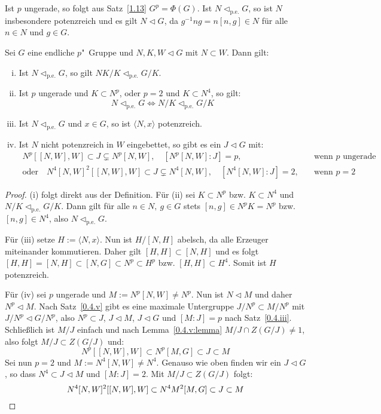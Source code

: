 \documentclass[11pt,a4paper,openany]{memoir}
\begin{document}
\begin{remark}
Ist $p$ ungerade, so folgt aus Satz~\ref{1.13} $G^p=\Phi(G)$. Ist $N\lhd_\text{p.e.}G$, so ist $N$ insbesondere potenzreich und es gilt $N\lhd G$, da $g^{-1}n g=n[n,g]\in N$ für alle $n\in N$ und $g\in G$.
\end{remark}

\begin{lemma}\label{2.2}
Sei $G$ eine endliche $p$"~Gruppe und $N,K,W\lhd G$ mit $N\subset W$. Dann gilt:
\begin{enumerate}[(i)]
\item Ist $N\lhd_\text{p.e.}G$, so gilt $NK/K\lhd_\text{p.e.}G/K$.
\item Ist $p$ ungerade und $K\subset N^p$, oder $p=2$ und $K\subset N^4$, so gilt: \[N\lhd_\text{p.e.}G \iff N/K\lhd_\text{p.e.}G/K\]
\item Ist $N\lhd_\text{p.e.}G$ und $x\in G$, so ist $\langle N,x\rangle$ potenzreich.
\item Ist $N$ nicht potenzreich in $W$ eingebettet, so gibt es ein $J\lhd G$ mit:
\begin{align*}
N^p[[N,W],W] \subset J\subsetneq N^p[N,W],\quad [N^p[N,W]:J]=p,&\quad\text{wenn $p$ ungerade}\\
\text{oder}\quad N^4[N,W]^2[[N,W],W]\subset J\subsetneq N^4[N,W],\quad [N^4[N,W]:J]=2,&\quad\text{wenn $p=2$}
\end{align*}
\end{enumerate}
\end{lemma}

\begin{proof}
(i) folgt direkt aus der Definition. Für (ii) sei $K\subset N^p$ bzw. $K\subset N^4$ und $N/K\lhd_\text{p.e.}G/K$. Dann gilt für alle $n\in N,\ g\in G$ stets $[n,g]\in N^pK=N^p$ bzw. $[n,g]\in N^4$, also $N\lhd_\text{p.e.}G$. 

Für (iii) setze $H:=\langle N,x\rangle$. Nun ist $H/[N,H]$ abelsch, da alle Erzeuger miteinander kommutieren. Daher gilt $[H,H]\subset [N,H]$ und es folgt $[H,H]= [N,H]\subset[N,G]\subset N^p\subset H^p$ bzw. $[H,H]\subset H^4$. Somit ist $H$ potenzreich. 

Für (iv) sei $p$ ungerade und $M:=N^p[N,W]\neq N^p$. Nun ist $N\lhd M$ und daher $N^p\lhd M$. Nach Satz~\ref{0.4.v} gibt es eine maximale Untergruppe $J/N^p\subset M/N^p$ mit $J/N^p\lhd G/N^p$, also $N^p\subset J$, $J\lhd M$, $J\lhd G$ und $[M:J]=p$ nach Satz~\ref{0.4.iii}. Schließlich ist $M/J$ einfach und nach Lemma~\ref{0.4.v:lemma} $M/J\cap Z(G/J)\neq 1$, also folgt $M/J\subset Z(G/J)$ und:
\[N^p[[N,W],W]\subset N^p[M,G] \subset J\subset M \]
Sei nun $p=2$ und $M:=N^4[N,W]\neq N^4$. Genauso wie oben finden wir ein $J\lhd G$, so dass $N^4\subset J\lhd M$ und $[M:J]=2$. Mit $M/J\subset Z(G/J)$ folgt:
\[N^4[N,W]^2[[N,W],W]\subset N^4 M^2 [M,G]\subset J\subset M\qedhere \]
\end{proof}
\end{document}

